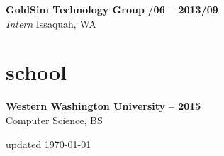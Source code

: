 \documentclass[margin,10pt]{res}
\begin{document}
\begin{resume}
    \textbf{GoldSim Technology Group} \hfill \textsc{\bfseries{}/06 -- 2013/09}\\
    \textit{Intern} \hfill Issaquah, WA 

\section{\sc \lsstyle school}
    \textbf{Western Washington University} \hfill \textsc{\bfseries{} -- 2015}\\
    Computer Science, BS

\end{resume}
\begin{minipage}[t]{\textwidth}
    \flushright
    \small
    \sc \lsstyle
    \hfill updated \today
\end{minipage}
\end{document}
